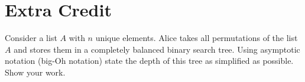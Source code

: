 \section{Extra Credit}
    Consider a list $A$ with $n$ unique elements.  Alice takes all permutations of the list $A$ and stores them in a completely balanced binary search tree.  Using asymptotic notation (big-Oh notation) state the depth of this tree as simplified as possible.  Show your work.